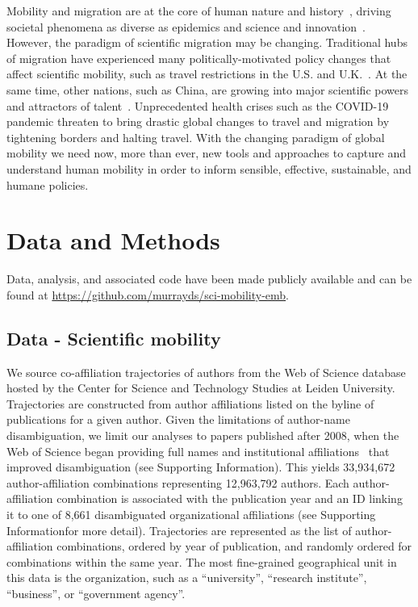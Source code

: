 \documentclass[12pt]{article} %
\def\SI{Supporting Information}
\begin{document}
Mobility and migration are at the core of human nature and history~\autocite{shah2020migration}, driving societal phenomena as diverse as epidemics\autocite{kraemer2020covid, truscott2012epidemicgravity, xia2005measlesgravity} and science and innovation~\autocite{kaiser2018innovation, armano2017innovation, sugimoto2017mostimpact, petersen2018multiscale, franzoni2014advantage, morgan2018prestige, rodrigues2016mobility}.
However, the paradigm of scientific migration may be changing.
Traditional hubs of migration have experienced many politically-motivated policy changes that affect scientific mobility, such as travel restrictions in the U.S. and U.K.~\autocite{chinchilla2018travelban}.
At the same time, other nations, such as China, are growing into major scientific powers and attractors of talent~\autocite{tollefson2018china, cao2020returning}.
Unprecedented health crises such as the COVID-19 pandemic threaten to bring drastic global changes to travel and migration by tightening borders and halting travel.
With the changing paradigm of global mobility we need now, more than ever, new tools and approaches to capture and understand human mobility in order to inform sensible, effective, sustainable, and humane policies.

%
%
\section*{Data and Methods}
\label{sec:datamethods} %

Data, analysis, and associated code have been made publicly available and can be found at \url{https://github.com/murrayds/sci-mobility-emb}.

\subsection*{Data - Scientific mobility}
We source co-affiliation trajectories of authors from the Web of Science database hosted by the Center for Science and Technology Studies at Leiden University.
Trajectories are constructed from author affiliations listed on the byline of publications for a given author.
Given the limitations of author-name disambiguation, we limit our analyses to papers published after 2008, when the Web of Science began providing full names and institutional affiliations~\autocite{caron2014disambiguation} that improved disambiguation (see \SI).
This yields 33,934,672 author-affiliation combinations representing 12,963,792 authors.
Each author-affiliation combination is associated with the publication year and an ID linking it to one of 8,661 disambiguated organizational affiliations (see \SI for more detail).
Trajectories are represented as the list of author-affiliation combinations, ordered by year of publication, and randomly ordered for combinations within the same year. The most fine-grained geographical unit in this data is the organization, such as a ``university'', ``research institute'', ``business'', or ``government agency''.
\end{document}
